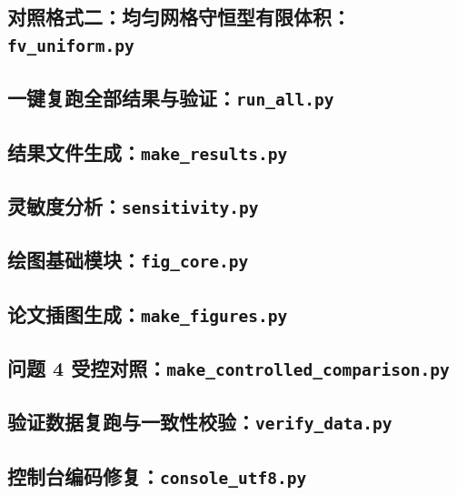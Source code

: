 \documentclass[bwprint]{cumcmthesis}
\begin{document}
\subsection{对照格式二：均匀网格守恒型有限体积：\texttt{fv\_uniform.py}}


\subsection{一键复跑全部结果与验证：\texttt{run\_all.py}}


\subsection{结果文件生成：\texttt{make\_results.py}}


\subsection{灵敏度分析：\texttt{sensitivity.py}}


\subsection{绘图基础模块：\texttt{fig\_core.py}}


\subsection{论文插图生成：\texttt{make\_figures.py}}


\subsection{问题 4 受控对照：\texttt{make\_controlled\_comparison.py}}


\subsection{验证数据复跑与一致性校验：\texttt{verify\_data.py}}


\subsection{控制台编码修复：\texttt{console\_utf8.py}}

\end{document}
